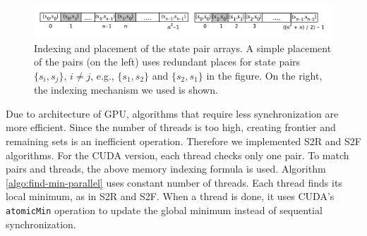 \begin{figure}
	\centering
	\includegraphics[width=\textwidth]{figs/memory.pdf}
	\caption{Indexing and placement of the state pair arrays. A simple placement of the pairs (on the left) uses redundant places for state pairs $\{s_i, s_j\}$, $i \neq j$, e.g., $\{s_1, s_2\}$ and $\{s_2, s_1\}$ in the figure. On the right, the indexing mechanism we used is shown.}
	\label{fig:mem}
\end{figure}

Due to architecture of GPU, algorithms that require less synchronization are more efficient. Since the number of threads is too high, creating frontier and remaining sets is an inefficient operation. Therefore we implemented S2R and S2F algorithms. For the CUDA version, each thread checks only one pair. To match pairs and threads, the above memory indexing formula is used.  Algorithm \ref{algo:find-min-parallel} uses constant number of threads. Each thread finds its local minimum, as in S2R and S2F. 
When a thread is done, it uses CUDA's {\tt atomicMin} operation to update the global minimum instead of sequential synchronization. 
